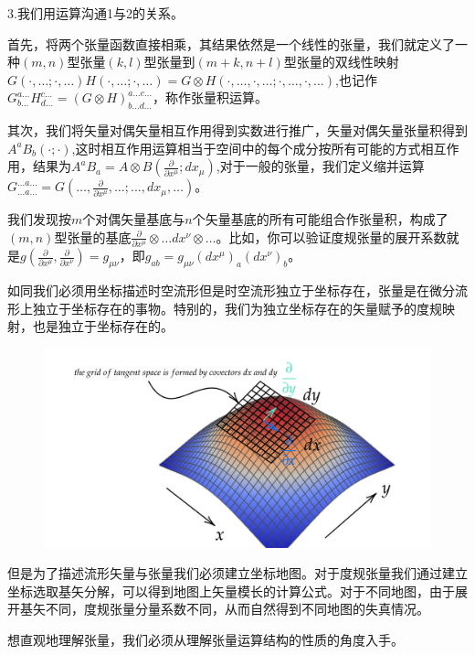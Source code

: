 \documentclass{article}
\begin{document}
3.我们用运算沟通1与2的关系。

首先，将两个张量函数直接相乘，其结果依然是一个线性的张量，我们就定义了一种$(m,n)$型张量$(k,l)$型张量到$(m+k,n+l)$型张量的双线性映射$G(\cdot,\dots;\cdot,\dots)H(\cdot,\dots;\cdot,\dots)=G\otimes H(\cdot,\dots,\cdot,\dots;\cdot,\dots,\cdot,\dots)$,也记作$G^{a\dots}_{b\dots}H^{c\dots}_{d\dots}=(G\otimes H)^{a\dots c\dots}_{b\dots d\dots}$，称作张量积运算。

其次，我们将矢量对偶矢量相互作用得到实数进行推广，矢量对偶矢量张量积得到$A^aB_b(\cdot;\cdot)$,这时相互作用运算相当于空间中的每个成分按所有可能的方式相互作用，结果为$A^aB_a=A\otimes B(\frac{\partial}{\partial x^\mu };dx_\mu)$,对于一般的张量，我们定义缩并运算$G^{\dots a \dots}_{\dots a \dots}=G(\dots,\frac{\partial}{\partial x^\mu },\dots;\dots,dx_\mu,\dots)$。

我们发现按$m$个对偶矢量基底与$n$个矢量基底的所有可能组合作张量积，构成了$(m,n)$型张量的基底$\frac{\partial}{\partial x^\mu }\otimes \dots dx^\nu \otimes \dots$。比如，你可以验证度规张量的展开系数就是$g( \frac{\partial}{\partial x^\mu }, \frac{\partial}{\partial x^\nu})=g_{\mu \nu }$，即$g_{ab}=g_{\mu \nu }(dx^\mu )_a(dx^\nu )_b$。

如同我们必须用坐标描述时空流形但是时空流形独立于坐标存在，张量是在微分流形上独立于坐标存在的事物。特别的，我们为独立坐标存在的矢量赋予的度规映射，也是独立于坐标存在的。

\begin{figure}[htbp]
    \centering
    \includegraphics[scale=0.25]{7.png}
\end{figure}

但是为了描述流形矢量与张量我们必须建立坐标地图。对于度规张量我们通过建立坐标选取基矢分解，可以得到地图上矢量模长的计算公式。对于不同地图，由于展开基矢不同，度规张量分量系数不同，从而自然得到不同地图的失真情况。

想直观地理解张量，我们必须从理解张量运算结构的性质的角度入手。
\end{document}
